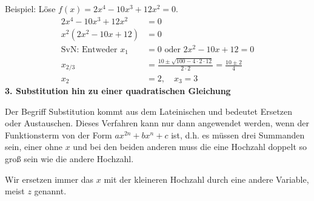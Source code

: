 Beispiel: Löse \(f(x)=2x^4-10x^3+12x^2=0\).
{\large\textcolor{loes}{\begin{align*}
		2x^4-10x^3+12x^2&=0\\
		x^2\left(2x^2-10x+12\right) &=0\\
		\text{SvN: Entweder }x_1&=0 \text{ oder }2x^2-10x+12=0\\
		x_{2/3}&=\frac{10\pm\sqrt{100-4\cdot 2\cdot 12}}{2\cdot 2}=\frac{10\pm 2}{4}\\
		x_2&=2,\quad x_3=3
\end{align*}}}\newpage
\textbf{3. Substitution hin zu einer quadratischen Gleichung}

Der Begriff Substitution kommt aus dem Lateinischen und bedeutet Ersetzen oder Austauschen. Dieses Verfahren kann nur dann angewendet werden, wenn der Funktionsterm von der Form \(ax^{2n}+bx^n+c\) ist, d.h. es müssen drei Summanden sein, einer ohne \(x\) und bei den beiden anderen muss die eine Hochzahl doppelt so groß sein wie die andere Hochzahl.

Wir ersetzen immer das \(x\) mit der kleineren Hochzahl durch eine andere Variable, meist \(z\) genannt.

